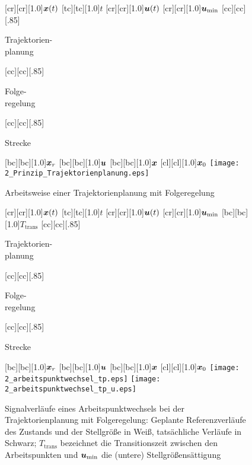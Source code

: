 \begin{figure}[h]
\newcommand{\smallsize}{.85}
	[cr][cr][1.0]{$\boldsymbol{x}(t)$}
	[tc][tc][1.0]{$t$}
	[cr][cr][1.0]{$\boldsymbol{u}(t)$}
	[cr][cr][1.0]{$\boldsymbol{u}_{\min}$}
	[cc][cc][\smallsize]{\parbox[c]{7cm}{\begin{center}Trajektorien-\\ planung \end{center}}}
	[cc][cc][\smallsize]{\parbox[c]{7cm}{\begin{center}Folge-\\ regelung \end{center}}}
	[cc][cc][\smallsize]{\parbox[c]{7cm}{\begin{center}Strecke \end{center}}}
	[bc][bc][1.0]{$\boldsymbol{x}_r$}
	[bc][bc][1.0]{$\boldsymbol{u}$}
	[bc][bc][1.0]{$\boldsymbol{x}$}
	[cl][cl][1.0]{$\boldsymbol{x}_0$}
	\centering
	\texttt{[image: 2\_Prinzip\_Trajektorienplanung.eps]} \\
	  	\caption{Arbeitsweise einer Trajektorienplanung mit Folgeregelung}
    \label{fig:arbeitspunktwechsel_tp_prinzip}
\end{figure} 
%
\begin{figure}[h]
\newcommand{\smallsize}{.85}
	[cr][cr][1.0]{$\boldsymbol{x}(t)$}
	[tc][tc][1.0]{$t$}
	[cr][cr][1.0]{$\boldsymbol{u}(t)$}
	[cr][cr][1.0]{$\boldsymbol{u}_{\min}$}
	[bc][bc][1.0]{$T_\text{trans}$}
	[cc][cc][\smallsize]{\parbox[c]{7cm}{\begin{center}Trajektorien-\\ planung \end{center}}}
	[cc][cc][\smallsize]{\parbox[c]{7cm}{\begin{center}Folge-\\ regelung \end{center}}}
	[cc][cc][\smallsize]{\parbox[c]{7cm}{\begin{center}Strecke \end{center}}}
	[bc][bc][1.0]{$\boldsymbol{x}_r$}
	[bc][bc][1.0]{$\boldsymbol{u}$}
	[bc][bc][1.0]{$\boldsymbol{x}$}
	[cl][cl][1.0]{$\boldsymbol{x}_0$}
	\centering
  	\texttt{[image: 2\_arbeitspunktwechsel\_tp.eps]} 
	\hspace{.5cm}
		 \texttt{[image: 2\_arbeitspunktwechsel\_tp\_u.eps]}
  	\caption[Signalverläufe bei der Trajektorienplanung]{Signalverläufe eines Arbeitspunktwechsels bei der Trajektorienplanung mit Folgeregelung: Geplante Referenzverläufe des Zustands und der Stellgröße in Weiß, tatsächliche Verläufe in Schwarz; $T_\text{trans}$ bezeichnet die Transitionszeit zwischen den Arbeitspunkten und $\boldsymbol{u}_{\min}$ die (untere) Stellgrößensättigung}
    \label{fig:arbeitspunktwechsel_tp}
\end{figure}
